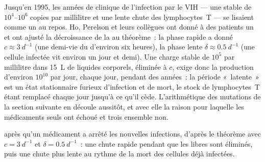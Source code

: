\begin{example}\label{ex:b3:virology:hiv}
Jusqu'en 1995, les années de  clinique de l'infection par le VIH
--- une  stable de $10^{4}$--$10^{6}$ copies par
millilitre et une lente chute des lymphocytes~T --- se lisaient comme un
 au repos. Ho, Perelson et leurs collègues ont donné à des
patients un  et ont ajusté la décroissance de la
 au théorème~: la phase rapide a donné
$c \approx \qty{3}{d^{-1}}$ (une demi-vie du  d'environ six
heures), la phase lente $\delta \approx
\qty{0.5}{d^{-1}}$ (une cellule infectée vit environ un jour et demi).
Une charge stable de $10^{5}$ par millilitre dans \qty{15}{L} de
liquides corporels, éliminée à $c$, exige donc la production d'environ
$10^{10}$  par jour, chaque jour, pendant des années~: la
période «~latente~» est un état stationnaire furieux d'infection et de
mort, le stock de lymphocytes~T étant remplacé chaque jour jusqu'à ce
qu'il cède. L'arithmétique des mutations de la section suivante en
découle aussitôt, et avec elle la raison pour laquelle les médicaments
seuls ont échoué et trois ensemble non.
\end{example}

\begin{omfigure}

{\small {} après qu'un médicament a arrêté les nouvelles
infections, d'après le théorème avec $c = \qty{3}{d^{-1}}$ et
$\delta = \qty{0.5}{d^{-1}}$~: une chute rapide pendant que les 
libres sont éliminés, puis une chute plus lente au rythme de la mort
des cellules déjà infectées.}
\end{omfigure}

